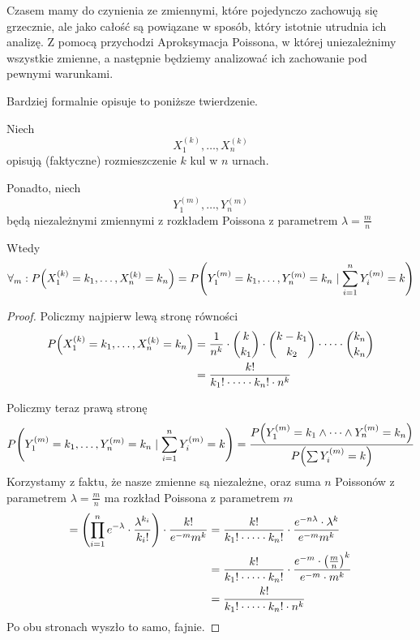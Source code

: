 Czasem mamy do czynienia ze zmiennymi, które pojedynczo zachowują się grzecznie, ale jako całość są
powiązane w sposób, który istotnie utrudnia ich analizę.
Z pomocą przychodzi Aproksymacja Poissona, w której uniezależnimy wszystkie zmienne, a następnie będziemy analizować ich zachowanie pod pewnymi warunkami.

Bardziej formalnie opisuje to poniższe twierdzenie.

\begin{theorem}[Twierdzenie 5.6 P\&C]
    \label{poisson-approximation-probability-equality}
    Niech 
    \[
        X_1^{(k)}, \dots, X_n^{(k)}
    \]
    opisują (faktyczne) rozmieszczenie \( k \) kul w \( n \) urnach.
    
    Ponadto, niech
    \[
        Y_1^{(m)}, \dots, Y_n^{(m)}
    \]
    będą niezależnymi zmiennymi z rozkładem Poissona z parametrem \( \lambda = \frac{m}{n} \)
    
    Wtedy
    \[
        \forall_m : P\pars{X_1^{(k)} = k_1, \dots, X_n^{(k)} = k_n}
        = P\pars{Y_1^{(m)} = k_1, \dots, Y_n^{(m)} = k_n \mid \sum_{i=1}^n Y_i^{(m)} = k}
    \]
\end{theorem}
\begin{proof}
    Policzmy najpierw lewą stronę równości
    \begin{align*}
        P\pars{X_1^{(k)} = k_1, \dots, X_n^{(k)} = k_n}
            &= \frac{1}{n^k} \cdot \binom{k}{k_1} \cdot \binom{k - k_1}{k_2} \cdot \dots \cdot \binom{k_n}{k_n} \\
            &= \frac{k!}{k_1!\cdot \dots \cdot k_n! \cdot n^k}
    \end{align*}
    
    Policzmy teraz prawą stronę
    \[
         P\pars{Y_1^{(m)} = k_1, \dots, Y_n^{(m)} = k_n \mid \sum_{i=1}^n Y_i^{(m)} = k}
            = \frac{P\pars{Y_1^{(m)} = k_1 \land \dots \land Y_n^{(m)} = k_n}}{P\pars{\sum Y_i^{(m)} = k}}
    \]
    Korzystamy z faktu, że nasze zmienne są niezależne, oraz suma \( n \) Poissonów z parametrem \( \lambda = \frac{m}{n} \) ma rozkład Poissona z parametrem \( m \)
    \begin{align*}
        = \left(\prod_{i=1}^n e^{-\lambda}\cdot\frac{\lambda^{k_i}}{k_i!} \right) \cdot \frac{k!}{e^{-m}m^k} 
        &= \frac{k!}{k_1!\cdot \dots \cdot k_n!} \cdot \frac{e^{-n\lambda} \cdot \lambda^k}{e^{-m}m^k} \\
        &= \frac{k!}{k_1!\cdot \dots \cdot k_n!} \cdot \frac{e^{-m} \cdot \left(\frac{m}{n}\right)^k}{e^{-m}\cdot m^k} \\
        &= \frac{k!}{k_1!\cdot \dots \cdot k_n! \cdot n^k}
    \end{align*}
    Po obu stronach wyszło to samo, fajnie.
\end{proof}

